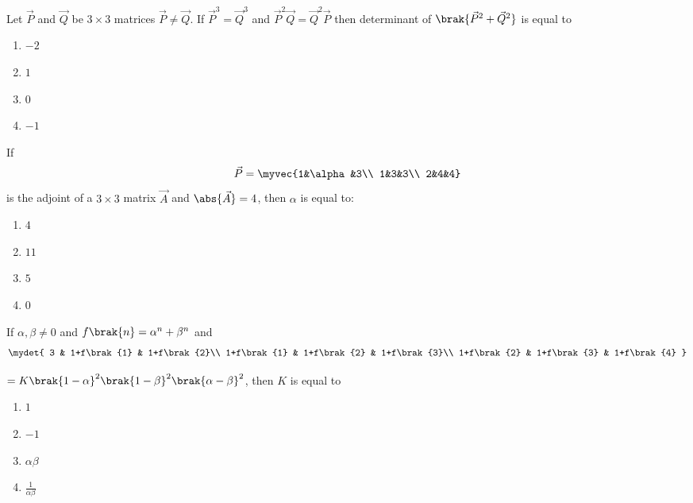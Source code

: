 	\item Let $\vec{P}$ and $\vec{Q}$ be $3\times3$ matrices $\vec{P}\neq \vec{Q}$. If $\vec{P}^3=\vec{Q}^3$ and $\vec{P}^2\vec{Q}=\vec{Q}^2\vec{P}$ then determinant of $\brak{\vec{P}^2+\vec{Q}^2}$ is equal to
	\hfill{}
        \begin{enumerate}
                \item $-2$
                \item $1$
                \item $0$
                \item $-1$
        \end{enumerate}

	\item If \begin{align*}
		\vec{P} = \myvec{1&\alpha&3\\
		1&3&3\\
		2&4&4}
	\end{align*} is the adjoint of a $3\times3$ matrix $\vec{A}$ and $\abs{\vec{A}} = 4$, then $\alpha$ is equal to:
	\hfill{}
        \begin{enumerate}
                \item $4$
                \item $11$
                \item $5$
                \item $0$
        \end{enumerate}

	\item If $\alpha,\beta\neq 0$ and $f\brak{n} = \alpha^n + \beta^n$ and
		\newline
		\begin{align*}
			\mydet{
				3 & 1+f\brak{1} & 1+f\brak{2}\\
				1+f\brak{1} & 1+f\brak{2} & 1+f\brak{3}\\
				1+f\brak{2} & 1+f\brak{3} & 1+f\brak{4}
			}
		\end{align*}

		$=K\brak{1-\alpha}^2\brak{1-\beta}^2\brak{\alpha-\beta}^2$,
		then $K$ is equal to

	\hfill{}
        \begin{enumerate}
                \item $1$
                \item $-1$
                \item $\alpha\beta$
		\item $\frac{1}{\alpha\beta}$
        \end{enumerate}


